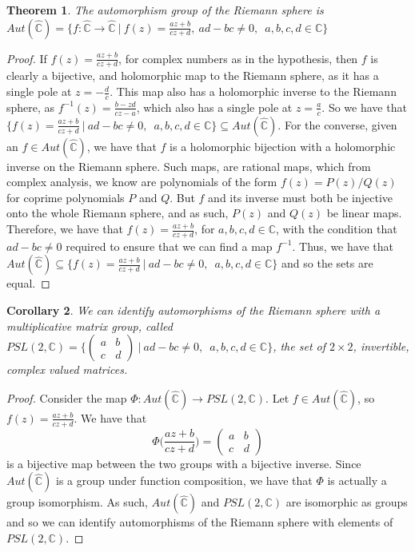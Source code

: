 \documentclass[11pt]{report}
\newtheorem{thm}{Theorem}[section]
\newtheorem{cor}[thm]{Corollary}
\theoremstyle{definition}
\begin{document}
\begin{thm}\label{AutSphere}
  The automorphism group of the Riemann sphere is ~\\
  $Aut(\widehat{\mathbb{C}}) = \bigl\{f:\widehat{\mathbb{C}} \rightarrow \widehat{\mathbb{C}} \ \vert \ f(z) = \frac{az+b}{cz+d}, \ ad-bc \neq 0, \enspace a, b, c ,d \in \mathbb{C}\bigr\}$
\end{thm}
\begin{proof}
  If $f(z)=\frac{az+b}{cz+d}$, for complex numbers as in the hypothesis, then $f$ is clearly a bijective, and holomorphic map to the Riemann sphere, as it has a single pole at $z = -\frac{d}{c}$. This map also has a holomorphic inverse to the Riemann sphere, as $f^{-1}(z) = \frac{b-zd}{cz-a}$, which also has a single pole at $z=\frac{a}{c}$. So we have that $\bigl\{f(z) = \frac{az+b}{cz+d}\ \vert \ ad-bc \neq 0, \enspace a, b, c ,d \in \mathbb{C}\bigr\} \subseteq Aut(\widehat{\mathbb{C}})$. For the converse, given an $f \in Aut(\widehat{\mathbb{C}})$, we have that $f$ is a holomorphic bijection with a holomorphic inverse on the Riemann sphere. Such maps, are rational maps, which from complex analysis, we know are polynomials of the form $f(z)=P(z)/Q(z)$ for coprime polynomials $P$ and $Q$. But $f$ and its inverse must both be injective onto the whole Riemann sphere, and as such, $P(z)$ and $Q(z)$ be linear maps. Therefore, we have that $f(z)=\frac{az+b}{cz+d}$, for $a,b,c,d \in \mathbb{C}$, with the condition that $ad-bc \neq 0$ required to ensure that we can find a map $f^{-1}$. Thus, we have that $Aut(\widehat{\mathbb{C}}) \subseteq \bigl\{f(z) = \frac{az+b}{cz+d}\ \vert \ ad-bc \neq 0, \enspace a, b, c ,d \in \mathbb{C}\bigr\}$ and so the sets are equal.
\end{proof} 
\begin{cor}
  We can identify automorphisms of the Riemann sphere with a multiplicative matrix group, called $PSL(2,\mathbb{C}) = \Bigg\{ \begin{pmatrix} a & b\\ c & d \end{pmatrix} \ \Bigg\vert \ ad-bc \neq 0, \enspace a, b, c ,d \in \mathbb{C}\Bigg\}$, the set of $2\times 2$, invertible, complex valued matrices. 
\end{cor}
\begin{proof}
  Consider the map $\Phi : Aut(\widehat{\mathbb{C}}) \rightarrow PSL(2,\mathbb{C})$. Let $f \in Aut(\widehat{\mathbb{C}})$, so $f(z) = \frac{az+b}{cz+d}$. We have that \[\Phi\Big(\frac{az+b}{cz+d}\Big) = \begin{pmatrix} a & b\\ c & d \end{pmatrix}\] is a bijective map between the two groups with a bijective inverse. Since $Aut(\widehat{\mathbb{C}})$ is a group under function composition, we have that $\Phi$ is actually a group isomorphism. As such, $Aut(\widehat{\mathbb{C}})$ and $PSL(2,\mathbb{C})$ are isomorphic as groups and so we can identify automorphisms of the Riemann sphere with elements of $PSL(2,\mathbb{C})$. 
\end{proof}
\end{document}
